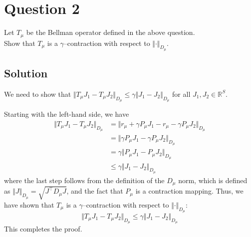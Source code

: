 \section*{Question 2}

Let \( T_{\mu} \) be the Bellman operator defined in the above question. \\
Show that \( T_{\mu} \) is a \( \gamma \)--contraction with respect to \( {\Vert \cdot \Vert}_{D_{\mu}} \).

\subsection*{Solution}

We need to show that \( \Vert T_{\mu} J_{1} - T_{\mu} J_{2} \Vert_{D_{\mu}} \leq \gamma \Vert J_{1} - J_{2} \Vert_{D_{\mu}} \) for all \( J_{1}, J_{2} \in \mathbb{R}^{S} \).

Starting with the left-hand side, we have
\begin{align*}
    \Vert T_{\mu} J_{1} - T_{\mu} J_{2} \Vert_{D_{\mu}}
     & =
    \Vert r_{\mu} + \gamma P_{\mu} J_{1} - r_{\mu} - \gamma P_{\mu} J_{2} \Vert_{D_{\mu}}
    \\
     & =
    \Vert \gamma P_{\mu} J_{1} - \gamma P_{\mu} J_{2} \Vert_{D_{\mu}}
    \\
     & =
    \gamma \Vert P_{\mu} J_{1} - P_{\mu} J_{2} \Vert_{D_{\mu}}
    \\
     & \leq
    \gamma \Vert J_{1} - J_{2} \Vert_{D_{\mu}}
\end{align*}
where the last step follows from the definition of the \( D_{\mu} \) norm, which is defined as \( \Vert J \Vert_{D_{\mu}} = \sqrt{J^{\top} D_{\mu} J} \), and the fact that \( P_{\mu} \) is a contraction mapping.
Thus, we have shown that \( T_{\mu} \) is a \( \gamma \)--contraction with respect to \( {\Vert \cdot \Vert}_{D_{\mu}} \):
\[
    \Vert T_{\mu} J_{1} - T_{\mu} J_{2} \Vert_{D_{\mu}} \leq \gamma \Vert J_{1} - J_{2} \Vert_{D_{\mu}}
\]
This completes the proof.
